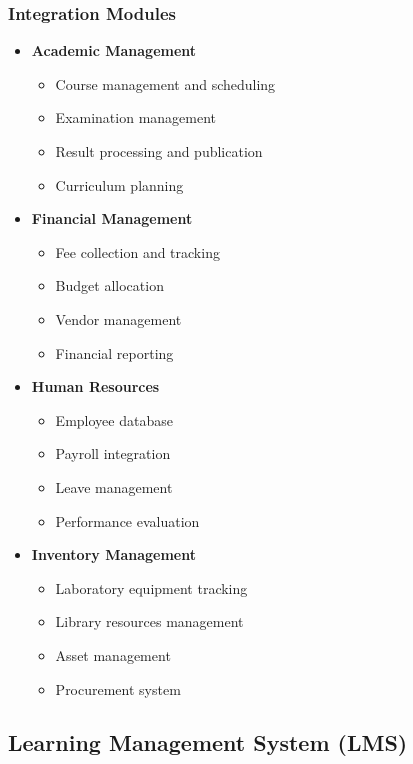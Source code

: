 \documentclass[12pt,a4paper]{report}
\begin{document}
\subsubsection*{Integration Modules}
\begin{itemize}
    \item \textbf{Academic Management}
    \begin{itemize}
        \item Course management and scheduling
        \item Examination management
        \item Result processing and publication
        \item Curriculum planning
    \end{itemize}
    
    \item \textbf{Financial Management}
    \begin{itemize}
        \item Fee collection and tracking
        \item Budget allocation
        \item Vendor management
        \item Financial reporting
    \end{itemize}
    
    \item \textbf{Human Resources}
    \begin{itemize}
        \item Employee database
        \item Payroll integration
        \item Leave management
        \item Performance evaluation
    \end{itemize}
    
    \item \textbf{Inventory Management}
    \begin{itemize}
        \item Laboratory equipment tracking
        \item Library resources management
        \item Asset management
        \item Procurement system
    \end{itemize}
\end{itemize}

\subsection{Learning Management System (LMS)}
\end{document}
